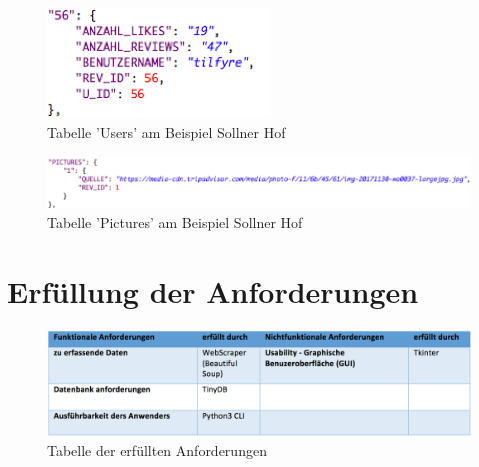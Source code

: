 \documentclass[a4paper,oneside,12pt]{report}
\begin{document}
	
	\begin{figure}[H]
		\centering
		\begin{minipage}[b]{0.3\textwidth}
			\includegraphics[width=\textwidth]{Bilder/JSONUser.png}
		\end{minipage}
		\centering
		\caption[Tabelle 'Users' am Beispiel Sollner Hof]{Tabelle 'Users' am Beispiel Sollner Hof}
		\label{pic-JSONUsers}
	\end{figure}
	
	
	\begin{figure}[H]
		\centering
		\begin{minipage}[b]{1\textwidth}
			\includegraphics[width=\textwidth]{Bilder/JSONPic.png}
		\end{minipage}
		\centering
		\caption[Tabelle 'Pictures' am Beispiel Sollner Hof]{Tabelle 'Pictures' am Beispiel Sollner Hof}
		\label{pic-JSONPic}
	\end{figure}
	


	\chapter{Erfüllung der Anforderungen}

		\begin{figure}[H]
					\centering
					\begin{minipage}[b]{0.9\textwidth}
						\includegraphics[width=\textwidth]{Bilder/TabErfuellt.png}
					\end{minipage}
					\centering
					\caption[Tabelle der erfüllten Anforderungen]{Tabelle der erfüllten Anforderungen}
					\label{TabErfuellt}
				\end{figure}		
	
\end{document}
